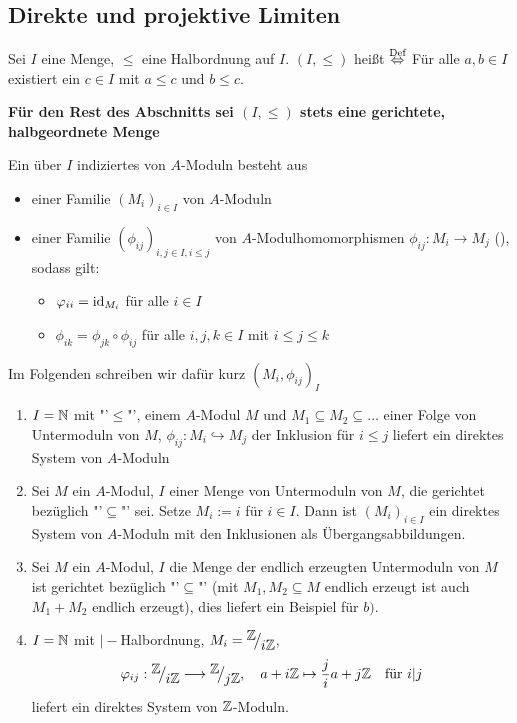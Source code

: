 \subsection{Direkte und projektive Limiten}
\begin{df}\label{16.1}
	Sei $I$ eine Menge, $\leq$ eine Halbordnung auf $I$. $(I, \leq)$ heißt  $\overset{\text{Def}}{\Leftrightarrow}$ Für alle $a,b\in I$ existiert ein $c\in I$ mit $a\leq c$ und $b\leq c$.
\end{df}
\begin{center}
	\textbf{Für den Rest des Abschnitts sei $(I, \leq)$ stets eine gerichtete, halbgeordnete Menge}
\end{center}
\begin{df}\label{16.2}
	Ein über $I$ indiziertes  von $A$-Moduln besteht aus
	\begin{itemize}
		\item einer Familie $(M_i)_{i\in I}$ von $A$-Moduln
		\item einer Familie $(\phi_{ij})_{i,j\in I, i\leq j}$ von $A$-Modulhomomorphismen $\phi_{ij}:M_i \to M_j$ (), sodass gilt:
		\begin{itemize}
			\item $\varphi_{ii}= \operatorname{id}_{M_i}$ für alle $i\in I$
			\item $\phi_{ik}= \phi_{jk} \circ \phi_{ij}$ für alle $i,j,k\in I$ mit $i\leq j \leq k$
		\end{itemize}
	\end{itemize} 
	Im Folgenden schreiben wir dafür kurz $(M_i, \phi_{ij})_I$
\end{df}
\begin{bsp}\label{16.3}
	\begin{enumerate}[label = \alph*)]
		\item $I=\mathbb{N}$ mit "'$\leq$"', einem $A$-Modul $M$ und $M_1 \subseteq M_2 \subseteq \ldots $ einer Folge von Untermoduln von $M$, $\phi_{ij}:M_i \hookrightarrow M_j$ der Inklusion für $i\leq j$ liefert ein direktes System von $A$-Moduln
		\item Sei $M$ ein $A$-Modul, $I$ einer Menge von Untermoduln von $M$, die gerichtet bezüglich "'$\subseteq$"' sei. Setze $M_i:= i$ für $i\in I$. Dann ist $(M_i)_{i\in I}$ ein direktes System von $A$-Moduln mit den Inklusionen als Übergangsabbildungen.
		\item Sei $M$ ein $A$-Modul, $I$ die Menge der endlich erzeugten Untermoduln von $M$ ist gerichtet bezüglich "'$\subseteq$"' (mit $M_1, M_2\subseteq M$ endlich erzeugt ist auch $M_1+M_2$ endlich erzeugt), dies liefert ein Beispiel für $b)$.
		\item $I=\mathbb{N}$ mit $\big| -$Halbordnung, $M_i= \QR{\Z}{i\Z}$, 
		$$\phi_{ij}:\QR{\Z}{i\Z} \longrightarrow \QR{\Z}{j\Z}, \quad a+ i\Z\mapsto \frac{j}{i}a + j\Z\quad \text{für } i|j$$
		liefert ein direktes System von $\mathbb{Z}$-Moduln.
	\end{enumerate}
\end{bsp}
